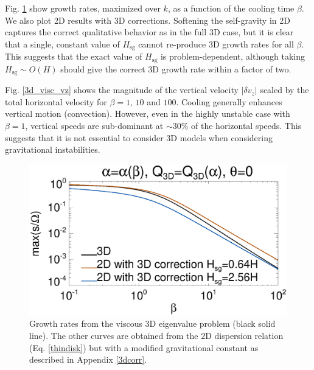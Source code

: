 Fig. \ref{3d_visc} show growth rates, maximized over $k$, as a
function of the cooling time $\beta$. We also plot 2D results with 3D
corrections. Softening the self-gravity in 2D captures the correct 
qualitative behavior as in the full 3D case, but it is clear that a
single, constant value of $H_\mathrm{sg}$ cannot re-produce 3D growth 
rates for all $\beta$. 
This suggests that the exact value of
$H_\mathrm{sg}$ is problem-dependent, although taking
$H_\mathrm{sg}\sim O(H)$ should give the correct 3D growth rate within
a factor of two. 

Fig. \ref{3d_visc_vz} shows the magnitude of the vertical velocity
$|\delta v_z|$ scaled by the total horizontal velocity for $\beta =
1,\,10$ and $100$. Cooling generally enhances vertical motion
(convection). However, even in the highly unstable case with $\beta=1$,
vertical speeds are sub-dominant at $\sim 30\%$ of the horizontal
speeds. This suggests that it is not essential to consider 3D models
when considering gravitational instabilities. 

\begin{figure}
  \includegraphics[width=\linewidth,clip=true,trim=0cm 0.cm 0.cm
    0.0cm]{figures/growth_visc3d}
  \caption{Growth rates from the viscous 3D eigenvalue problem (black solid
    line). The other curves are obtained from the 2D dispersion
    relation (Eq. \ref{thindisk}) but with a modified gravitational
    constant as described in Appendix \ref{3dcorr}. \label{3d_visc}}
\end{figure}



